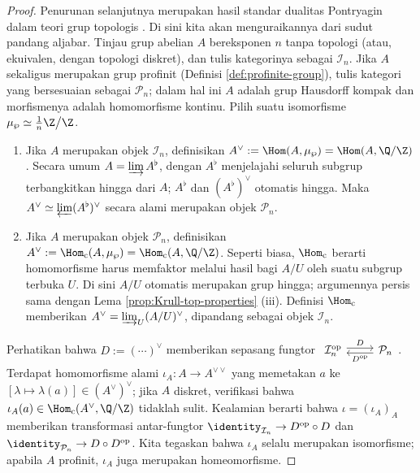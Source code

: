 \begin{proof}
	Penurunan selanjutnya merupakan hasil standar dualitas Pontryagin dalam teori grup topologis \cite[Bab III]{FL14}. Di sini kita akan menguraikannya dari sudut pandang aljabar. Tinjau grup abelian $A$ bereksponen $n$ tanpa topologi (atau, ekuivalen, dengan topologi diskret), dan tulis kategorinya sebagai $\mathcal{I}_n$. Jika $A$ sekaligus merupakan grup profinit (Definisi \ref{def:profinite-group}), tulis kategori yang bersesuaian sebagai $\mathcal{P}_n$; dalam hal ini $A$ adalah grup Hausdorff kompak dan morfismenya adalah homomorfisme kontinu. Pilih suatu isomorfisme $\mu_\wp \simeq \frac{1}{n}\Z\big/\Z$.
	\begin{enumerate}
		\item Jika $A$ merupakan objek $\mathcal{I}_n$, definisikan $A^\vee:=\Hom(A,\mu_\wp)=\Hom(A,\Q/\Z)$. Secara umum $A=\varinjlim A^\flat$, dengan $A^\flat$ menjelajahi seluruh subgrup terbangkitkan hingga dari $A$; $A^\flat$ dan $(A^\flat)^\vee$ otomatis hingga. Maka $A^\vee\simeq\varprojlim(A^\flat)^\vee$ secara alami merupakan objek $\mathcal{P}_n$.
		\item Jika $A$ merupakan objek $\mathcal{P}_n$, definisikan $A^\vee:=\Hom_{\text{c}}(A,\mu_\wp)=\Hom_{\text{c}}(A,\Q/\Z)$. Seperti biasa, $\Hom_{\text{c}}$ berarti homomorfisme harus memfaktor melalui hasil bagi $A/U$ oleh suatu subgrup terbuka $U$. Di sini $A/U$ otomatis merupakan grup hingga; argumennya persis sama dengan Lema \ref{prop:Krull-top-properties} (iii). Definisi $\Hom_{\text{c}}$ memberikan $A^\vee=\varinjlim_U(A/U)^\vee$, dipandang sebagai objek $\mathcal{I}_n$.
	\end{enumerate}
	Perhatikan bahwa $D := (\cdots)^\vee$ memberikan sepasang fungtor
	$ \begin{tikzcd} \mathcal{I}_n^\text{op} \arrow[r, yshift=0.5ex, "D"] & \arrow[l, yshift=-0.5ex, "{D^\text{op}}"] \mathcal{P}_n \end{tikzcd}$.
	Terdapat homomorfisme alami $\iota_A : A \to A^{\vee\vee}$ yang memetakan $a$ ke $[\lambda \mapsto \lambda(a)] \in (A^\vee)^\vee$; jika $A$ diskret, verifikasi bahwa $\iota_A(a) \in \Hom_{\text{c}}(A^\vee, \Q/\Z)$ tidaklah sulit. Kealamian berarti bahwa $\iota = (\iota_A)_A$ memberikan transformasi antar-fungtor $\identity_{\mathcal{I}_n} \to D^\text{op} \circ D$ dan $\identity_{\mathcal{P}_n} \to D \circ D^\text{op}$. Kita tegaskan bahwa $\iota_A$ selalu merupakan isomorfisme; apabila $A$ profinit, $\iota_A$ juga merupakan homeomorfisme.
	

\end{proof}
